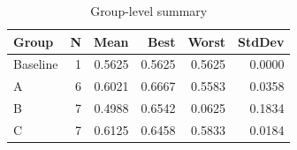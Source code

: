 \begin{table}[htbp]
\centering
\caption{Group-level summary}
\label{tab:group-summary}
\begin{tabular}{lrrrrr}
\toprule
\textbf{Group} & \textbf{N} & \textbf{Mean} & \textbf{Best} & \textbf{Worst} & \textbf{StdDev} \\
\midrule
Baseline & 1 & 0.5625 & 0.5625 & 0.5625 & 0.0000 \\
A & 6 & 0.6021 & 0.6667 & 0.5583 & 0.0358 \\
B & 7 & 0.4988 & 0.6542 & 0.0625 & 0.1834 \\
C & 7 & 0.6125 & 0.6458 & 0.5833 & 0.0184 \\
\bottomrule
\end{tabular}
\end{table}